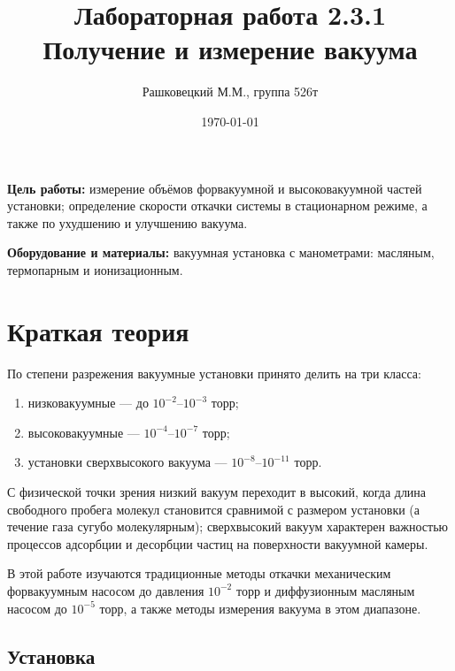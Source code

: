 \documentclass[12pt]{article}
\author{Рашковецкий М.М., группа 526т}
\date{\today}
\title{Лабораторная работа 2.3.1\\Получение и измерение вакуума}
\begin{document}
	\maketitle
	
	{\parindent=1cm \hangindent=1cm \parskip=0.5cm
	{\bfseries Цель работы:} измерение объёмов форвакуумной и высоковакуумной частей установки; определение скорости откачки системы в стационарном режиме, а также по ухудшению и улучшению вакуума.
	
	\hangindent=1cm
	{\bfseries Оборудование и материалы:} вакуумная установка с манометрами: масляным, термопарным и ионизационным.\par}
	\section*{Краткая теория}
	
	\indent По степени разрежения вакуумные установки принято делить на три класса:
	\begin{enumerate}
		\item низковакуумные --- до $10^{-2}$--$10^{-3}$ торр;
		\item высоковакуумные --- $10^{-4}$--$10^{-7}$ торр;
		\item установки сверхвысокого вакуума --- $10^{-8}$--$10^{-11}$ торр.
	\end{enumerate}
	С физической точки зрения низкий вакуум переходит в высокий, когда длина свободного пробега молекул становится сравнимой с размером установки (а течение газа сугубо молекулярным); сверхвысокий вакуум характерен важностью процессов адсорбции и десорбции частиц на поверхности вакуумной камеры.
	
	В этой работе изучаются традиционные методы откачки механическим форвакуумным насосом до давления $10^{-2}$ торр и диффузионным масляным насосом до $10^{-5}$ торр, а также методы измерения вакуума в этом диапазоне.
	
	\subsection*{Установка}
	
\end{document}
